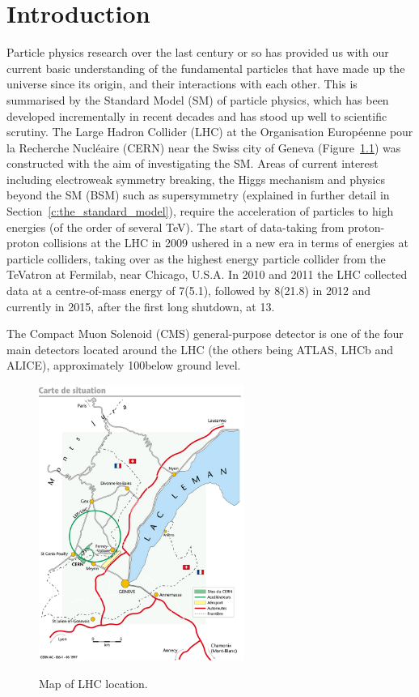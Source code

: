 \chapter{Introduction}
\label{c:introduction}
Particle physics research over the last century or so has provided us with our current basic understanding of
the fundamental particles that have made up the universe since its origin, and their interactions with each
other. This is summarised by the Standard Model (SM) of particle physics, which has been developed
incrementally in recent decades and has stood up well to scientific scrutiny. The Large Hadron Collider (LHC)
at the Organisation Europ\'{e}enne pour la Recherche Nucl\'{e}aire (CERN) near the Swiss city of Geneva
(Figure~\ref{fig:LHC_map}) was constructed with the aim of investigating the SM. Areas of current interest
including electroweak symmetry breaking, the Higgs mechanism and physics beyond the SM (BSM) such as
supersymmetry (explained in further detail in Section~\ref{c:the_standard_model}), require the acceleration of
particles to high energies (of the order of several TeV). The start of data-taking from proton-proton
collisions at the LHC in 2009 ushered in a new era in terms of energies at particle colliders, taking over as
the highest energy particle collider from the TeVatron at Fermilab, near Chicago, U.S.A. In 2010 and 2011 the
LHC collected data at a centre-of-mass energy of 7\TeV (5.1\fbinv), followed by 8\TeV (21.8\fbinv) in 2012 and
currently in 2015, after the first long shutdown, at 13\TeV.

The Compact Muon Solenoid (CMS) general-purpose detector is one of the four main detectors located around the
LHC (the others being ATLAS, LHCb and ALICE), approximately 100\m below ground level.

\begin{figure}[!hbtp]
   \centering
     \includegraphics[width=0.6\textwidth]{Chapters/01_Introduction/Images/lhc-pho-1997-169.jpg}\\
     \caption{Map of LHC location.}
     \label{fig:LHC_map}
\end{figure}

